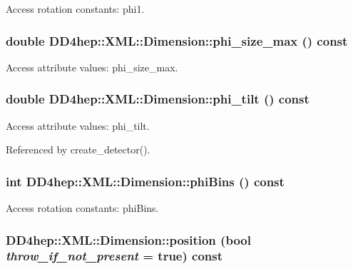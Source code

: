 Access rotation constants: phi1. \hypertarget{struct_d_d4hep_1_1_x_m_l_1_1_dimension_a3aced51c654c8422a2717d4e71ebbcbc}{
\subsubsection[{phi\_\-size\_\-max}]{\setlength{\rightskip}{0pt plus 5cm}double DD4hep::XML::Dimension::phi\_\-size\_\-max () const}}
\label{struct_d_d4hep_1_1_x_m_l_1_1_dimension_a3aced51c654c8422a2717d4e71ebbcbc}


Access attribute values: phi\_\-size\_\-max. \hypertarget{struct_d_d4hep_1_1_x_m_l_1_1_dimension_a82569e3f303b1ae28a5ce00c3c7df624}{
\subsubsection[{phi\_\-tilt}]{\setlength{\rightskip}{0pt plus 5cm}double DD4hep::XML::Dimension::phi\_\-tilt () const}}
\label{struct_d_d4hep_1_1_x_m_l_1_1_dimension_a82569e3f303b1ae28a5ce00c3c7df624}


Access attribute values: phi\_\-tilt. 

Referenced by create\_\-detector().\hypertarget{struct_d_d4hep_1_1_x_m_l_1_1_dimension_a081b3802be576b9ef2971fda9e671cd1}{
\subsubsection[{phiBins}]{\setlength{\rightskip}{0pt plus 5cm}int DD4hep::XML::Dimension::phiBins () const}}
\label{struct_d_d4hep_1_1_x_m_l_1_1_dimension_a081b3802be576b9ef2971fda9e671cd1}


Access rotation constants: phiBins. \hypertarget{struct_d_d4hep_1_1_x_m_l_1_1_dimension_ade822cf5553f636e5679f2cd2d4733fa}{
\subsubsection[{position}]{ DD4hep::XML::Dimension::position (bool {\em throw\_\-if\_\-not\_\-present} = {\ttfamily true}) const}}
\label{struct_d_d4hep_1_1_x_m_l_1_1_dimension_ade822cf5553f636e5679f2cd2d4733fa}


